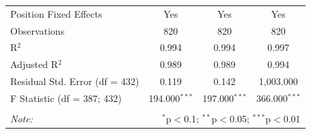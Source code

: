 \documentclass[12pt]{article}
\begin{document}
\begin{landscape}
\begin{table}[!htbp]
\begin{tabular}{@{\extracolsep{5pt}}lccc}
				Position Fixed Effects & Yes & Yes & Yes \\ 
				Observations & 820 & 820 & 820 \\ 
				R$^{2}$ & 0.994 & 0.994 & 0.997 \\ 
				Adjusted R$^{2}$ & 0.989 & 0.989 & 0.994 \\ 
				Residual Std. Error (df = 432) & 0.119 & 0.142 & 1,003.000 \\ 
				F Statistic (df = 387; 432) & 194.000$^{***}$ & 197.000$^{***}$ & 366.000$^{***}$ \\ 
				\hline 
				\hline \\[-1.8ex] 
				\textit{Note:}  & \multicolumn{3}{r}{$^{*}$p$<$0.1; $^{**}$p$<$0.05; $^{***}$p$<$0.01} \\ 
			\end{tabular} 
		\end{table} 
		

\end{landscape}
\end{document}
